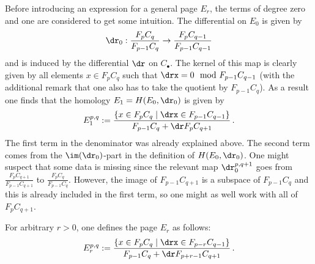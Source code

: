 
	Before introducing an expression for a general page $E_r$, the terms of degree zero and one are considered to get some intuition. The differential on $E_0$ is given by
	\begin{gather}
		\dr_0:\frac{F_pC_q}{F_{p-1}C_q}\rightarrow\frac{F_pC_{q-1}}{F_{p-1}C_{q-1}}
	\end{gather}
	and is induced by the differential $\dr$ on $C_\bullet$. The kernel of this map is clearly given by all elements $x\in F_pC_q$ such that $\drx=0\mod F_{p-1}C_{q-1}$ (with the additional remark that one also has to take the quotient by $F_{p-1}C_q$). As a result one finds that the homology $E_1=H(E_0,\dr_0)$ is given by
	\begin{gather}
		E_1^{p,q}:=\frac{\{x\in F_pC_q\mid\drx\in F_{p-1}C_{q-1}\}}{F_{p-1}C_q+\dr F_pC_{q+1}}\,.
	\end{gather}
	The first term in the denominator was already explained above. The second term comes from the $\im(\dr_0)$-part in the definition of $H(E_0,\dr_0)$. One might suspect that some data is missing since the relevant map $\dr_0^{p,q+1}$ goes from $\frac{F_pC_{q+1}}{F_{p-1}C_{q+1}}$ to $\frac{F_pC_q}{F_{p-1}C_{q}}$. However, the image of $F_{p-1}C_{q+1}$ is a subspace of $F_{p-1}C_q$ and this is already included in the first term, so one might as well work with all of $F_pC_{q+1}$.

	For arbitrary $r>0$, one defines the page $E_r$ as follows:
	\begin{gather}
    	E_r^{p,q}:=\frac{\{x\in F_pC_q\mid\drx\in F_{p-r}C_{q-1}\}}{F_{p-1}C_q+\dr F_{p+r-1}C_{q+1}}\,.
	\end{gather}

